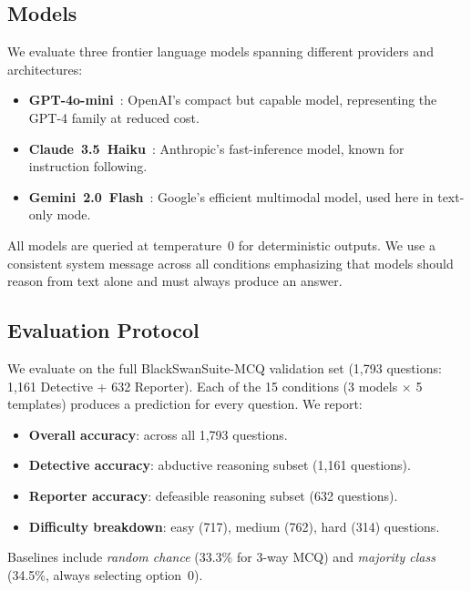 \subsection{Models}
\label{sec:models}

We evaluate three frontier language models spanning different providers and architectures:
\begin{itemize}[leftmargin=*,itemsep=1pt]
    \item \textbf{GPT-4o-mini}~\cite{openai2024gpt4o}: OpenAI's compact but capable model, representing the GPT-4 family at reduced cost.
    \item \textbf{Claude~3.5~Haiku}~\cite{anthropic2024claude}: Anthropic's fast-inference model, known for instruction following.
    \item \textbf{Gemini~2.0~Flash}~\cite{google2024gemini}: Google's efficient multimodal model, used here in text-only mode.
\end{itemize}

All models are queried at temperature~0 for deterministic outputs.
We use a consistent system message across all conditions emphasizing that models should reason from text alone and must always produce an answer.

\subsection{Evaluation Protocol}
\label{sec:eval}

We evaluate on the full BlackSwanSuite-MCQ validation set (1{,}793 questions: 1{,}161 Detective + 632 Reporter).
Each of the 15 conditions (3 models $\times$ 5 templates) produces a prediction for every question.
We report:
\begin{itemize}[leftmargin=*,itemsep=1pt]
    \item \textbf{Overall accuracy}: across all 1{,}793 questions.
    \item \textbf{Detective accuracy}: abductive reasoning subset (1{,}161 questions).
    \item \textbf{Reporter accuracy}: defeasible reasoning subset (632 questions).
    \item \textbf{Difficulty breakdown}: easy (717), medium (762), hard (314) questions.
\end{itemize}

Baselines include \emph{random chance} (33.3\% for 3-way MCQ) and \emph{majority class} (34.5\%, always selecting option~0).
